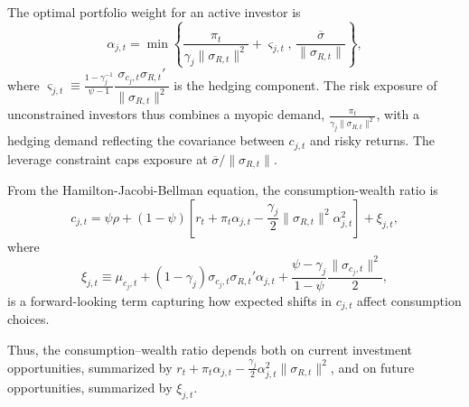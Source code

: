 The optimal portfolio weight for an active investor is
\begin{equation}\label{eq:portfolio_share}
    \alpha_{j,t} = \min \left\{ 
        \frac{\pi_t}{\gamma_j \|\sigma_{R,t}\|^2} + \varsigma_{j,t}, \,
        \frac{\overline{\sigma}}{\|\sigma_{R,t}\|} 
    \right\},
\end{equation}
where $\varsigma_{j,t} \equiv \frac{1-\gamma_j^{-1}}{\psi-1} 
\dfrac{\sigma_{c_j,t} \sigma_{R,t}'}{\|\sigma_{R,t}\|^2}$ is the hedging component. The risk exposure of unconstrained investors thus combines a myopic demand, $\frac{\pi_t}{\gamma_j \|\sigma_{R,t}\|^2}$, with a hedging demand reflecting the covariance between $c_{j,t}$ and risky returns. The leverage constraint caps exposure at $\overline{\sigma}/\|\sigma_{R,t}\|$.

From the Hamilton-Jacobi-Bellman equation, the consumption-wealth ratio is
\begin{equation}\label{eq:xi_j}
    c_{j,t} = \psi \rho 
    + (1-\psi) \left[ r_t + \pi_t \alpha_{j,t} 
        - \frac{\gamma_j}{2} \|\sigma_{R,t}\|^2 \alpha_{j,t}^2 \right] 
    + \xi_{j,t},
\end{equation}
where 
\[
    \xi_{j,t} \equiv \mu_{c_j,t} 
    + (1-\gamma_j) \sigma_{c_j,t} \sigma_{R,t}' \alpha_{j,t} 
    + \frac{\psi - \gamma_j}{1-\psi} \frac{\|\sigma_{c_j,t}\|^2}{2},
\]
is a forward-looking term capturing how expected shifts in $c_{j,t}$ affect consumption choices.

Thus, the consumption–wealth ratio depends both on current investment opportunities, summarized by $r_t + \pi_t \alpha_{j,t} - \frac{\gamma_j}{2} \alpha_{j,t}^2 \|\sigma_{R,t}\|^2$, and on future opportunities, summarized by $\xi_{j,t}$. 


